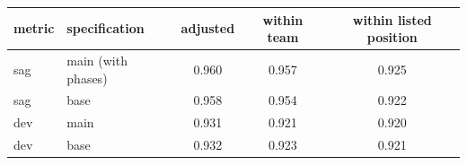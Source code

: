 \begin{tabular}{llccc}
\hline
metric & specification & adjusted & within team & within listed position \\
\hline
sag & main (with phases) & 0.960 & 0.957 & 0.925 \\
sag & base & 0.958 & 0.954 & 0.922 \\
dev & main & 0.931 & 0.921 & 0.920 \\
dev & base & 0.932 & 0.923 & 0.921 \\
\hline
\end{tabular}
